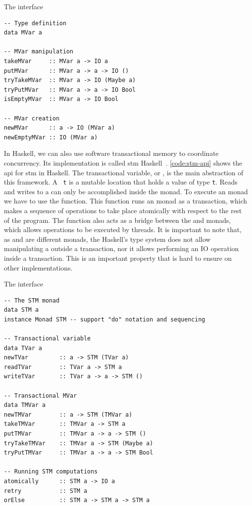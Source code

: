 \begin{listing}
  \caption{The \MVar interface}
  \begin{verbatim}
-- Type definition
data MVar a

-- MVar manipulation
takeMVar     :: MVar a -> IO a
putMVar      :: MVar a -> a -> IO ()
tryTakeMVar  :: MVar a -> IO (Maybe a)
tryPutMVar   :: MVar a -> a -> IO Bool
isEmptyMVar  :: MVar a -> IO Bool

-- MVar creation
newMVar      :: a -> IO (MVar a)
newEmptyMVar :: IO (MVar a)
  \end{verbatim}
  \label{code:mvar-api}
\end{listing}

In Haskell, we can also use software transactional memory to coordinate concurrency. Its implementation is called \acs{stm} Haskell~\citep{harris:2005}. \autoref{code:stm-api} shows the \acs{api} for \acs{stm} in Haskell. The transactional variable, or \TVar, is the main abstraction of this framework. A \TVar~\texttt{t} is a mutable location that holds a value of type \texttt{t}. Reads and writes to a \TVar can only be accomplished inside the \STM monad. To execute an \STM monad we have to use the \atomically function. This function runs an \STM monad as a transaction, which makes a sequence of operations to take place atomically with respect to the rest of the program. The \atomically function also acts as a bridge between the \IO and \STM monads, which allows \STM operations to be executed by threads. It is important to note that, as \STM and \IO are different monads, the Haskell's type system does not allow manipulating a \TVar outside a transaction, nor it allows performing an IO operation inside a transaction. This is an important property that is hard to ensure on other \STM implementations.

\begin{listing}
  \caption{The \STM interface}
  \begin{verbatim}
-- The STM monad
data STM a
instance Monad STM -- support "do" notation and sequencing

-- Transactional variable
data TVar a
newTVar         :: a -> STM (TVar a)
readTVar        :: TVar a -> STM a
writeTVar       :: TVar a -> a -> STM ()

-- Transactional MVar
data TMVar a
newTMVar        :: a -> STM (TMVar a)
takeTMVar       :: TMVar a -> STM a
putTMVar        :: TMVar a -> a -> STM ()
tryTakeTMVar    :: TMVar a -> STM (Maybe a)
tryPutTMVar     :: TMVar a -> a -> STM Bool

-- Running STM computations
atomically      :: STM a -> IO a
retry           :: STM a
orElse          :: STM a -> STM a -> STM a
  \end{verbatim}
  \label{code:stm-api}
\end{listing}

